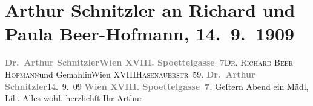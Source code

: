 

         
         \renewcommand{\erwaehntePersonen}{Personen: Richard Beer-Hofmann, Paula Beer-Hofmann, Lili Schnitzler}
         \renewcommand{\erwaehnteOrte}{Orte: Edmund-Weiß-Gasse, Hasenauerstraße, Wien, XVIII., Währing}
         \renewcommand{\erwaehnteWerke}{}
               \section[Arthur Schnitzler an Richard und Paula Beer-Hofmann, 14. 9. 1909]{ Arthur Schnitzler an Richard und Paula Beer-Hofmann,
               14. 9. 1909}\nopagebreak{}\rehead{ }\begin{ledgroupsized}[t]{13cm}\normalsize\beginnumbering \toendnotes[C]{\smallbreak\pagebreak[2]} 
\pstart{}{\pb}\textcolor{gray}{\textbf{Dr. Arthur Schnitzler}}\pend{}\pstart{}\textcolor{gray}{\textbf{Wien XVIII. Spoettelgasse 7}}\pend{}{\bigskip}\pstart{}{\pb}\textsc{Dr. Richard Beer Hofmann}\pend{}\pstart{}und Gemahlin\pend{}\pstart{}Wien XVIII\pend{}\pstart{}\textsc{Hasenauerstr 59}.\pend{}{\bigskip}\pstart
           \noindent{}{\pb}\textcolor{gray}{\textbf{Dr. Arthur Schnitzler}}\hfill 14. 9. 09\pend
           \pstart
           \textcolor{gray}{\textbf{Wien XVIII. Spoettelgasse 7.}}\pend
           \pstart
           Geſtern Abend ein Mädl, Lili. Alles wohl.\pend
           \pstart herzlichſt Ihr \spacefill\mbox{Arthur}\pend{}
         
         \endnumbering{}\end{ledgroupsized}  \newcommand{\dateiname}{L01873}\newcommand{\titel}{Arthur Schnitzler an Richard und Paula Beer-Hofmann, 14. 9. 1909}\newcommand{\editorInnen}{Martin Anton Müller und Gerd-Hermann Susen}
      